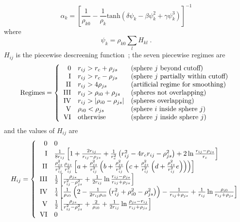 \begin{equation}
\alpha_k = \left[ \frac{1}{\rho_{k0}} - \frac{1}{\rho_k}\textrm{tanh}\left(\delta\psi_k - \beta\psi_k^2 + \gamma\psi_k^3\right)\right]^{-1} 
\end{equation}
where
\begin{equation}
\psi_k = \rho_{k0} \sum_l H_{kl} \; .
\end{equation}
$H_{ij}$ is the piecewise descreening function~\cite{ONUF04,HAWK96,SCHA90}; the seven piecewise regimes are
\begin{equation}
\textrm{Regimes} = \left\{
\begin{array}{r l l}
\textrm{0} & r_{ij} > r_c + \rho_{js} &(\textrm{sphere}~j~\textrm{beyond cutoff})\\
\textrm{I} & r_{ij} > r_c - \rho_{js} &(\textrm{sphere}~j~\textrm{partially within cutoff}) \\
\textrm{II} & r_{ij} > 4\rho_{js} &(\textrm{artificial regime for smoothing})\\
\textrm{III} & r_{ij} > \rho_{i0} + \rho_{js} &(\textrm{spheres not overlapping})\\
\textrm{IV} & r_{ij} > \left| \rho_{i0} - \rho_{js} \right| &(\textrm{spheres overlapping}) \\
\textrm{V} & \rho_{i0} < \rho_{js} &(\textrm{sphere}~i~\textrm{inside~sphere}~j)\\
\textrm{VI} & \textrm{otherwise} &(\textrm{sphere}~j~\textrm{inside~sphere}~j)\\
\end{array}\right.
\end{equation}
and the values of $H_{ij}$ are
\begin{equation}
H_{ij} = \left\{
\begin{array}{r l}
\textrm{0} & 0 \\
\textrm{I} & \frac{1}{8 r_{ij}}\left[ 1 + \frac{2 r_{ij}}{r_{ij}-\rho_{js}} + \frac{1}{r_c^2}\left( r_{ij}^2-4 r_c r_{ij} - \rho_{js}^2\right) +2 \ln \frac{r_{ij}-\rho_{js}}{r_c}\right] \\
\textrm{II} & \frac{\rho_{js}^2}{r_{ij}^2} \frac{\rho_{js}}{r_{ij}^2} \left[ a+ \frac{\rho_{js}^2}{r_{ij}^2}\left( b+\frac{\rho_{js}^2}{r_{ij}^2}\left( c+\frac{\rho_{js}^2}{r_{ij}^2}\left( d+\frac{\rho_{js}^2}{r_{ij}^2} e \right) \right) \right) \right] \\
\textrm{III} & \frac{1}{2} \left[\frac{\rho_{js}}{r_{ij}^2-\rho_{js}^2} + \frac{1}{2 r_{ij}} \ln \frac{r_{ij}-\rho_{js}}{r_{ij}+\rho_{js}} \right]\\
\textrm{IV} & \frac{1}{4} \left[ \frac{1}{\rho_{i0}}\left( 2-\frac{1}{2r_{ij}\rho_{i0}}\left(r_{ij}^2+\rho_{i0}^2-\rho_{js}^2\right)\right) - \frac{1}{r_{ij}+\rho_{js}} + \frac{1}{r_{ij}} \ln \frac{\rho_{i0}}{r_{ij}+\rho_{js}} \right]\\
\textrm{V} & \frac{1}{2} \left[\frac{\rho_{js}}{r_{ij}^2-\rho_{js}^2} + \frac{2}{\rho_{i0}} + \frac{1}{2 r_{ij}} \ln \frac{\rho_{js}-r_{ij}}{r_{ij}+\rho_{js}} \right]\\
\textrm{VI} & 0
\end{array}
\right.
\end{equation}
